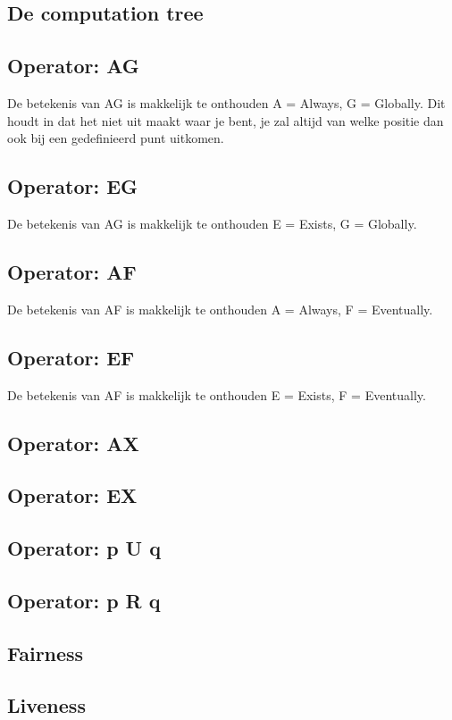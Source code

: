 \documentclass{article}%
\begin{document}
\subsection{De computation tree}
\subsection{Operator: AG}
De betekenis van AG is makkelijk te onthouden A = Always, G = Globally. Dit houdt in dat het niet uit maakt waar je bent, je zal altijd van welke positie dan ook bij een gedefinieerd punt uitkomen.

\subsection{Operator: EG}
De betekenis van AG is makkelijk te onthouden E = Exists, G = Globally.

\subsection{Operator: AF}
De betekenis van AF is makkelijk te onthouden A = Always, F = Eventually.
\subsection{Operator: EF}
De betekenis van AF is makkelijk te onthouden E = Exists, F = Eventually.
\subsection{Operator: AX}
\subsection{Operator: EX}
\subsection{Operator: p U q}
\subsection{Operator: p R q}
\subsection{Fairness}
\subsection{Liveness}
\newpage
\end{document}
